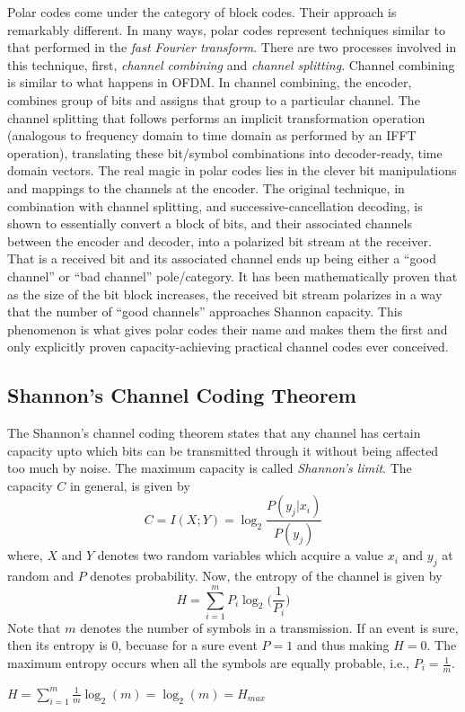 \documentclass[twocolumn]{report}
\begin{document}
\par Polar codes come under the category of block codes. Their approach is remarkably different. In many ways, polar codes represent techniques similar to that performed in the \textit{fast Fourier transform}. There are two processes involved in this technique, first, \textit{channel combining} and \textit{channel splitting}. Channel combining is similar to what happens in OFDM. In channel combining, the encoder, combines group of bits and assigns that group to a particular channel. The channel splitting that follows performs an implicit transformation operation (analogous to frequency domain to time domain as performed by an IFFT operation), translating these bit/symbol combinations into decoder-ready, time domain vectors.  The real magic in polar codes lies in the clever bit manipulations and mappings to the channels at the encoder. The original technique, in combination with channel splitting, and successive-cancellation decoding, is shown to essentially convert a block of bits, and their associated channels between the encoder and decoder, into a polarized bit stream at the receiver. That is a received bit and its associated channel ends up being either a “good channel” or “bad channel” pole/category. It has been mathematically proven that as the size of the bit block increases, the received bit stream polarizes in a way that the number of “good channels” approaches Shannon capacity. This phenomenon is what gives polar codes their name and makes them the first and only explicitly proven capacity-achieving practical channel codes ever conceived.

\subsection{Shannon's Channel Coding Theorem}
The Shannon's channel coding theorem states that any channel has certain capacity upto which bits can be transmitted through it without being affected too much by noise. The maximum capacity is called \textit{Shannon's limit}. The capacity $C$ in general, is given by 
\begin{equation}
C = I(X;Y) = \log_{2}\frac{P(y_{j}|x_{i})}{P(y_{j})}
\end{equation}
where, $X$ and $Y$ denotes two random variables which acquire a value $x_{i}$ and $y_{j}$ at random and $P$ denotes probability. Now, the entropy of the channel is given by 
\begin{equation}
H = \sum_{i=1}^{m}P_{i}\log_{2}\Bigg(\frac{1}{P_{i}}\Bigg)
\end{equation}
Note that $m$ denotes the number of symbols in a transmission. If an event is sure, then its entropy is 0, becuase for a sure event $P = 1$ and thus making $H=0$. The maximum entropy occurs when all the symbols are equally probable, i.e., $P_{i} = \frac{1}{m}$.
\begin{center}
$\displaystyle H = \sum_{i=1}^{m}\frac{1}{m}\log_{2}(m) = \log_{2}(m) = H_{max}$
\end{center}
\end{document}
